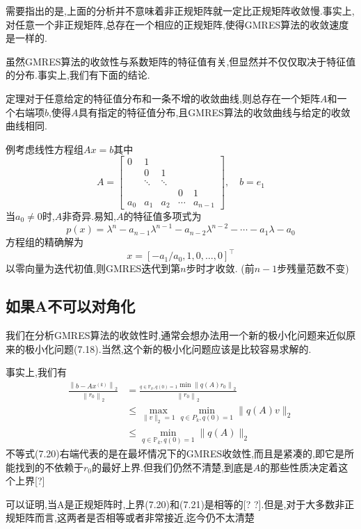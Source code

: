 \documentclass[12pt,a4paper]{article}
\begin{document}
需要指出的是,上面的分析并不意味着非正规矩阵就一定比正规矩阵收敛慢.事实上,对任意一个非正规矩阵,总存在一个相应的正规矩阵,使得GMRES算法的收敛速度是一样的.

虽然GMRES算法的收敛性与系数矩阵的特征值有关,但显然并不仅仅取决于特征值的分布.事实上,我们有下面的结论.

{\color{blue}定理}\quad 对于任意给定的特征值分布和一条不增的收敛曲线,则总存在一个矩阵$A$和一个右端项$b$,使得$A$具有指定的特征值分布,且GMRES算法的收敛曲线与给定的收敛曲线相同.

{\color{blue}例}\quad 考虑线性方程组$A x=b$其中
$$
A=\left[\begin{array}{ccccc}{0} & {1} & {} & {} \\ {} & {0} & {1} \\ {} & {\ddots} & {\ddots} & {} \\ {} & {} & {} & {0} & {1} \\ {a_{0}} & {a_{1}} & {a_{2}} & {\cdots} & {a_{n-1}}\end{array}\right], \quad b=e_{1}
$$
当$a_{0} \neq 0$时,$A$非奇异.易知,$A$的特征值多项式为
$$
p(x)=\lambda^{n}-a_{n-1} \lambda^{n-1}-a_{n-2} \lambda^{n-2}-\cdots-a_{1} \lambda-a_{0}
$$
方程组的精确解为
$$
x=\left[-a_{1} / a_{0}, 1,0, \ldots, 0\right]^{\top}
$$
以零向量为迭代初值,则GMRES迭代到第$n$步时才收敛. (前$n-1$步残量范数不变)

\subsection*{如果A不可以对角化}
我们在分析GMRES算法的收敛性时,通常会想办法用一个新的极小化问题来近似原来的极小化问题(7.18).当然,这个新的极小化问题应该是比较容易求解的.

事实上,我们有
$$
\begin{aligned} 
\frac{\left\|b-A x^{(k)}\right\|_{2}}{\left\|r_{0}\right\|_{2}} &=\frac{_{q \in \mathbb{P}_{k}, q(0)=1}{\min }\left\|q(A) r_{0}\right\|_{2}}{\left\|r_{0}\right\|_{2}} \\ 
& \leq \max _{\|v\|_{2}=1} \min _{q \in P_{k}, q(0)=1}\|q(A) v\|_{2} \\
& \leq \min _{q \in \mathbb{P}_{k}, q(0)=1}\|q(A)\|_{2} \end{aligned}
$$
不等式(7.20)右端代表的是在最坏情况下的GMRES收敛性,而且是紧凑的,即它是所能找到的不依赖于$r_{0}$的最好上界.但我们仍然不清楚,到底是$A$的那些性质决定着这个上界[?]

可以证明,当A是正规矩阵时,上界(7.20)和(7.21)是相等的[? ?].但是,对于大多数非正规矩阵而言,这两者是否相等或者非常接近,迄今仍不太清楚
\end{document}
